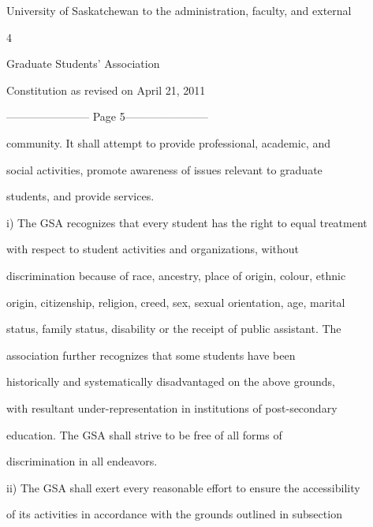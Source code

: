         University of Saskatchewan to the administration, faculty, and external  

                                                   

                                                4  



                                 Graduate Students’ Association  



                            Constitution as revised on April 21, 2011  


----------------------- Page 5-----------------------

        community.  It  shall  attempt  to  provide  professional,  academic,  and  

        social  activities,  promote  awareness  of  issues  relevant  to  graduate  

        students, and provide services.  



i)      The GSA recognizes that every student has the right to equal treatment  

        with     respect     to    student     activities     and     organizations,       without  

        discrimination because of race, ancestry, place of origin, colour, ethnic  

        origin, citizenship, religion, creed, sex, sexual orientation, age, marital  

        status,  family  status,  disability  or  the  receipt  of  public  assistant.  The  

        association       further     recognizes       that   some      students      have     been  

        historically  and  systematically  disadvantaged  on  the  above  grounds,  

        with  resultant  under-representation  in  institutions  of  post-secondary  

        education.      The     GSA      shall    strive   to   be    free   of    all  forms     of  

        discrimination in all endeavors.  



ii)     The GSA shall exert every reasonable effort to ensure the accessibility  

        of its activities in accordance with the grounds outlined in subsection  

